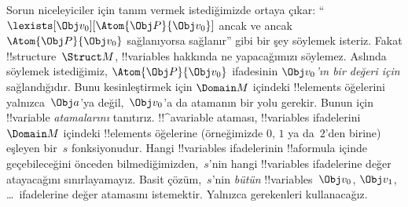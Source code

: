 Sorun niceleyiciler için tanım vermek istediğimizde ortaya çıkar:
``$\lexists[\Obj v_0][\Atom{\Obj P}{\Obj v_0}]$ ancak ve ancak
$\Atom{\Obj P}{\Obj v_0}$ sağlanıyorsa sağlanır'' gibi bir şey
söylemek isteriz. Fakat !!{structure}~$\Struct M$, !!{variable}s
hakkında ne yapacağımızı söylemez. Aslında söylemek istediğimiz,
$\Atom{\Obj P}{\Obj v_0}$ ifadesinin \emph{$\Obj v_0$'ın bir değeri
için} sağlandığıdır. Bunu kesinleştirmek için $\Domain M$ içindeki
!!{element}s öğelerini yalnızca~$\Obj a$'ya değil,~$\Obj v_0$'a da
atamanın bir yolu gerekir. Bunun için !!{variable} \emph{atamalarını}
tanıtırız. !!^a{variable} ataması, !!{variable}s ifadelerini
$\Domain M$ içindeki !!{element}s öğelerine (örneğimizde $0$, $1$ ya
da~$2$'den birine) eşleyen bir~$s$ fonksiyonudur. Hangi
!!{variable}s ifadelerinin !!a{formula} içinde geçebileceğini önceden
bilmediğimizden,~$s$'nin hangi !!{variable}s ifadelerine değer
atayacağını sınırlayamayız. Basit çözüm,~$s$'nin \emph{bütün}
!!{variable}s~$\Obj v_0$, $\Obj v_1$, \dots\ ifadelerine değer
atamasını istemektir. Yalnızca gerekenleri kullanacağız.

